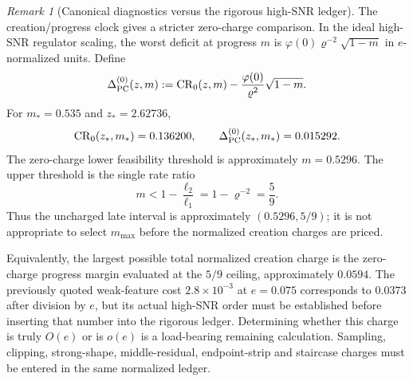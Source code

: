 \documentclass{article} %
\theoremstyle{plain}
\theoremstyle{definition}
\theoremstyle{remark}
\newtheorem{remark}[theorem]{Remark}
\begin{document}
\begin{remark}[Canonical diagnostics versus the rigorous high-SNR ledger]
The creation/progress clock gives a stricter zero-charge comparison.  In the
ideal high-SNR regulator scaling, the worst deficit at progress $m$ is
$\varphi(0)\varrho^{-2}\sqrt{1-m}$ in $e$-normalized units.  Define
\[
 \Delta_{\rm PC}^{(0)}(z,m)
 :=\mathrm{CR}_0(z,m)-\frac{\varphi(0)}{\varrho^2}\sqrt{1-m}.
\]
For $m_*=0.535$ and $z_*=2.62736$,
\[
 \mathrm{CR}_0(z_*,m_*)=0.136200,\qquad
 \Delta_{\rm PC}^{(0)}(z_*,m_*)=0.015292.
\]
The zero-charge lower feasibility threshold is approximately $m=0.5296$.
The upper threshold is the single rate ratio
\[
 m<1-\frac{\ell_2}{\ell_1}
   =1-\varrho^{-2}
   =\frac59.
\]
Thus the uncharged late interval is approximately
$(0.5296,5/9)$; it is not appropriate to select $m_{\max}$ before the
normalized creation charges are priced.

Equivalently, the largest possible total normalized creation charge is the
zero-charge progress margin evaluated at the $5/9$ ceiling, approximately
$0.0594$.  The previously quoted weak-feature cost
$2.8\times10^{-3}$ at $e=0.075$ corresponds to $0.0373$ after division by
$e$, but its actual high-SNR order must be established before inserting that
number into the rigorous ledger.  Determining whether this charge is truly
$O(e)$ or is $o(e)$ is a load-bearing remaining calculation.  Sampling,
clipping, strong-shape, middle-residual, endpoint-strip and staircase charges
must be entered in the same normalized ledger.
\end{remark}
\end{document}
